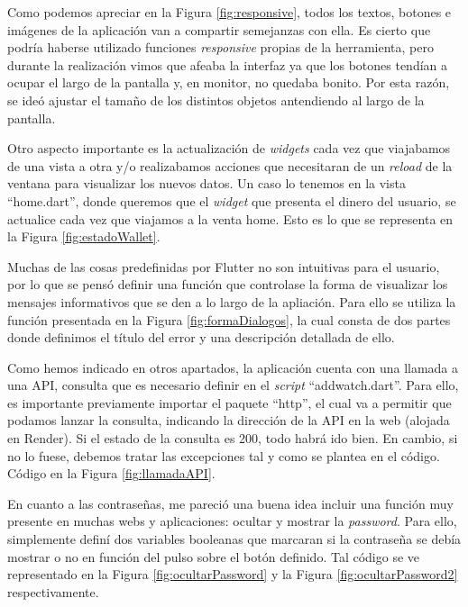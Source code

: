 	Como podemos apreciar en la Figura \ref{fig:responsive}, todos los textos, botones e imágenes de la aplicación van a compartir semejanzas con ella. Es cierto que podría haberse utilizado funciones \emph{responsive} propias de la herramienta, pero durante la realización vimos que afeaba la interfaz ya que los botones tendían a ocupar el largo de la pantalla y, en monitor, no quedaba bonito. Por esta razón, se ideó ajustar el tamaño de los distintos objetos antendiendo al largo de la pantalla.
	

	Otro aspecto importante es la actualización de \emph{widgets} cada vez que viajabamos de una vista a otra y/o realizabamos acciones que necesitaran de un \emph{reload} de la ventana para visualizar los nuevos datos. Un caso lo tenemos en la vista ``home.dart'', donde queremos que el \emph{widget} que presenta el dinero del usuario, se actualice cada vez que viajamos a la venta home. Esto es lo que se representa en la Figura \ref{fig:estadoWallet}. 


	Muchas de las cosas predefinidas por Flutter no son intuitivas para el usuario, por lo que se pensó definir una función que controlase la forma de visualizar los mensajes informativos que se den a lo largo de la apliación. Para ello se utiliza la función presentada en la Figura \ref{fig:formaDialogos}, la cual consta de dos partes donde definimos el título del error y una descripción detallada de ello.
	

	Como hemos indicado en otros apartados, la aplicación cuenta con una llamada a una API, consulta que es necesario definir en el \emph{script} ``addwatch.dart''. Para ello, es importante previamente importar el paquete ``http'', el cual va a permitir que podamos lanzar la consulta, indicando la dirección de la API en la web (alojada en Render). Si el estado de la consulta es 200, todo habrá ido bien. En cambio, si no lo fuese, debemos tratar las excepciones tal y como se plantea en el código. Código en la Figura \ref{fig:llamadaAPI}.


	En cuanto a las contraseñas, me pareció una buena idea incluir una función muy presente en muchas webs y aplicaciones: ocultar y mostrar la \emph{password}. Para ello, simplemente definí dos variables booleanas que marcaran si la contraseña se debía mostrar o no en función del pulso sobre el botón definido. Tal código se ve representado en la Figura \ref{fig:ocultarPassword} y la Figura \ref{fig:ocultarPassword2} respectivamente.

